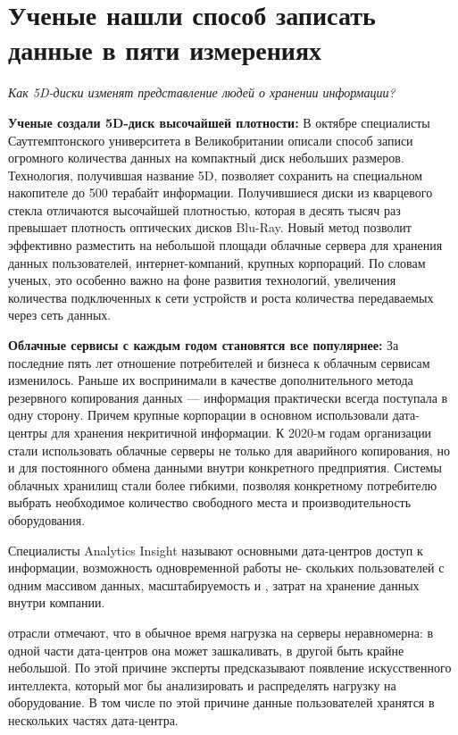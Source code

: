 \clearpage
\section{Ученые нашли способ записать данные в пяти измерениях}

\textit{Как 5D-диски изменят представление людей о хранении информации?}

\textbf{Ученые создали 5D-диск высочайшей плотности:} В октябре специалисты Саутгемптонского университета в Великобритании описали способ записи огромного количества данных на компактный диск небольших размеров. Технология, получившая название 5D, позволяет сохранить на специальном накопителе до 500 терабайт информации. Получившиеся диски из кварцевого стекла отличаются высочайшей плотностью, которая в десять тысяч раз превышает плотность оптических дисков Blu-Ray. Новый метод позволит эффективно разместить на небольшой площади облачные сервера для хранения данных пользователей, интернет-компаний, крупных корпораций. По словам ученых, это особенно важно на фоне развития технологий, увеличения количества подключенных к сети устройств и роста количества передаваемых через сеть данных.

\textbf{Облачные сервисы с каждым годом становятся все популярнее:}
За последние пять лет отношение потребителей и бизнеса к облачным сервисам изменилось. Раньше их воспринимали в качестве дополнительного метода резервного копирования данных --- информация практически всегда поступала в одну сторону. Причем крупные корпорации в основном использовали дата-центры для хранения некритичной информации. К 2020-м годам организации стали использовать облачные серверы не только для аварийного копирования, но и для постоянного обмена данными внутри конкретного предприятия. Системы облачных хранилищ стали более гибкими, позволяя конкретному потребителю выбрать необходимое количество свободного места и производительность оборудования.

Специалисты Analytics Insight называют основными   дата-центров  доступ к информации, возможность одновременной работы не- скольких пользователей с одним массивом данных, масштабируемость и ,  затрат на хранение данных внутри компании.

 отрасли отмечают, что в обычное время нагрузка на серверы неравномерна: в одной части дата-центров она может зашкаливать, в другой быть крайне небольшой. По этой причине эксперты предсказывают появление искусственного интеллекта, который мог бы анализировать и распределять нагрузку на оборудование. В том числе по этой причине данные пользователей хранятся в нескольких частях дата-центра.

